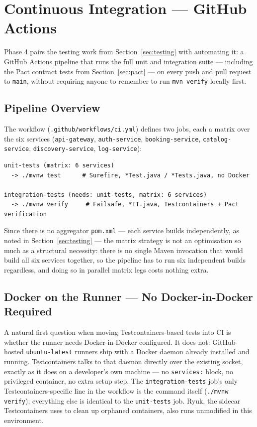 \section{Continuous Integration --- GitHub Actions}
\label{sec:ci}

Phase 4 pairs the testing work from Section~\ref{sec:testing} with automating it: a GitHub Actions pipeline that runs the full unit and integration suite --- including the Pact contract tests from Section~\ref{sec:pact} --- on every push and pull request to \texttt{main}, without requiring anyone to remember to run \texttt{mvn verify} locally first.

\subsection{Pipeline Overview}

The workflow (\texttt{.github/workflows/ci.yml}) defines two jobs, each a matrix over the six services (\texttt{api-gateway}, \texttt{auth-service}, \texttt{booking-service}, \texttt{catalog-service}, \texttt{discovery-service}, \texttt{log-service}):

\begin{lstlisting}[style=yamlstyle, caption={Pipeline shape --- two matrix jobs, one gating the other}]
unit-tests (matrix: 6 services)
  -> ./mvnw test      # Surefire, *Test.java / *Tests.java, no Docker

integration-tests (needs: unit-tests, matrix: 6 services)
  -> ./mvnw verify     # Failsafe, *IT.java, Testcontainers + Pact verification
\end{lstlisting}

Since there is no aggregator \texttt{pom.xml} --- each service builds independently, as noted in Section~\ref{sec:testing} --- the matrix strategy is not an optimisation so much as a structural necessity: there is no single Maven invocation that would build all six services together, so the pipeline has to run six independent builds regardless, and doing so in parallel matrix legs costs nothing extra.

\subsection{Docker on the Runner --- No Docker-in-Docker Required}

A natural first question when moving Testcontainers-based tests into CI is whether the runner needs Docker-in-Docker configured. It does not: GitHub-hosted \texttt{ubuntu-latest} runners ship with a Docker daemon already installed and running. Testcontainers talks to that daemon directly over the existing socket, exactly as it does on a developer's own machine --- no \texttt{services:} block, no privileged container, no extra setup step. The \texttt{integration-tests} job's only Testcontainers-specific line in the workflow is the command itself (\texttt{./mvnw verify}); everything else is identical to the \texttt{unit-tests} job. Ryuk, the sidecar Testcontainers uses to clean up orphaned containers, also runs unmodified in this environment.

